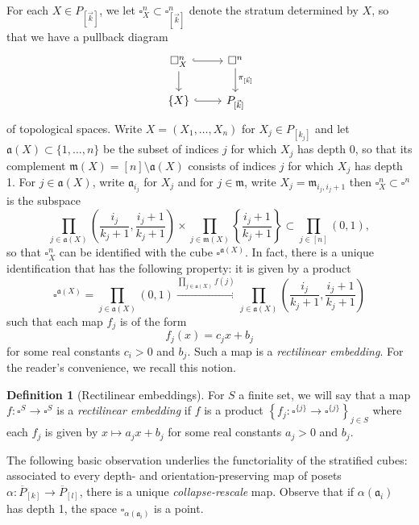 \documentclass[10pt, reqno, twoside
, final
]{amsart}
\numberwithin{equation}{subsection}%
\theoremstyle{definition}
\newtheorem{defn}{Definition}[subsection]
\theoremstyle{definition}
\theoremstyle{definition}
\theoremstyle{definition}
\theoremstyle{definition}
\theoremstyle{definition}
\theoremstyle{definition}
\theoremstyle{definition}
\theoremstyle{definition}
\theoremstyle{plain}
\theoremstyle{definition}
\theoremstyle{plain}
\theoremstyle{definition}
\theoremstyle{plain}
\theoremstyle{definition}
\theoremstyle{definition}
\theoremstyle{plain}
\theoremstyle{plain}
\theoremstyle{definition}
\theoremstyle{plain}
\theoremstyle{plain}
\theoremstyle{plain}
\begin{document}
For each $X\in P_{[\vec{k}]}$, we let $\square^n_X\subset \square^n_{[\vec{k}]}$ denote the stratum determined by $X$, so that we have a pullback diagram 
\[
\begin{tikzcd}
    \square^n_X\ar[d] \ar[r,hook] & \square^n \ar[d, "\pi_{[\vec{k}]}"] \\
    \{X\} \ar[r,hook] & P_{[\vec{k}]}
\end{tikzcd}
\]
of topological spaces. Write $X=(X_1,\ldots,X_n)$ for $X_j\in P_{[k_j]}$ and let $\mathfrak{a}(X)\subset \{1,\ldots,n\}$ be the subset of indices $j$ for which $X_j$ has depth 0, so that its complement $\mathfrak{m}(X)=[n]\setminus \mathfrak{a}(X)$ consists of indices $j$ for which $X_j$ has depth 1. For $j\in \mathfrak{a}(X)$, write $\mathfrak{a}_{i_j}$ for $X_j$ and for $j\in \mathfrak{m}$, write $X_j=\mathfrak{m}_{i_j,i_j+1}$ then $\square^n_X\subset \square^n $ is the subspace 
\[\prod_{j\in \mathfrak{a}(X)} \left(\frac{i_j}{k_j+1},\frac{i_j+1}{k_j+1}\right)\times \prod_{j\in \mathfrak{m}(X)} \left\{\frac{i_j+1}{k_j+1} \right\}\subset \prod_{j\in [n]}(0,1),\]
so that $\square^n_X$ can be identified with the cube $\square^{\mathfrak{a}(X)}$. In fact, there is a unique identification that has the following property: it is given by a product 
\[ \square^{\mathfrak{a}(X)}= \prod_{j\in \mathfrak{a}(X)}(0,1)\xrightarrow{\prod_{j\in \mathfrak{a}(X)}f(j)} \prod_{j\in \mathfrak{a}(X)} \left(\frac{i_j}{k_j+1},\frac{i_j+1}{k_j+1}\right)  \]
such that each map $f_j$ is of the form 
\[f_j(x) = c_jx+b_j\]
for some real constants $c_i>0$ and $b_j$. Such a map is a \emph{rectilinear embedding}. For the reader's convenience, we recall this notion.
\begin{defn}[Rectilinear embeddings]
For $S$ a finite set, we will say that a map $f:\square^S\rightarrow\square^S$ is a \emph{rectilinear embedding} if $f$ is a product $\left\{f_j:\square^{\{j\}}\rightarrow \square^{\{j\}}\right\}_{j\in S}$ where each $f_j$ is given by $x\mapsto a_jx+b_j$ for some real constants $a_j>0$ and $b_j$.
\end{defn}
The following basic observation underlies the functoriality of the stratified cubes: associated to every depth- and orientation-preserving map of posets $\alpha: \overline{P}_{[k]}\rightarrow \overline{P}_{[l]}$, there is a unique \emph{collapse-rescale} map. Observe that if $\alpha(\mathfrak{a}_i)$ has depth 1, the space $\square_{\alpha(\mathfrak{a}_i)}$ is a point.
\end{document}
